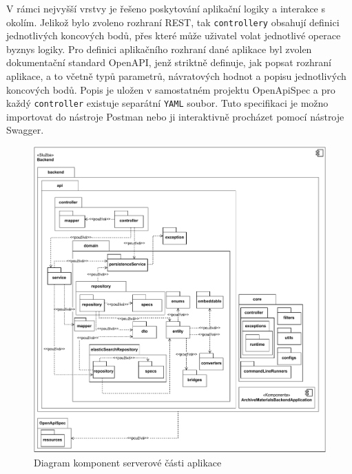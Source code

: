 \newpara
V rámci nejvyšší vrstvy je řešeno poskytování aplikační logiky a interakce s okolím. Jelikož bylo zvoleno rozhraní REST, tak \texttt{controllery} obsahují definici jednotlivých koncových bodů, přes které může uživatel volat jednotlivé operace byznys logiky.
\newpara
Pro definici aplikačního rozhraní dané aplikace byl zvolen dokumentační standard OpenAPI, jenž striktně definuje, jak popsat rozhraní aplikace, a to včetně typů parametrů, návratových hodnot a popisu jednotlivých koncových bodů. Popis je uložen v samostatném projektu OpenApiSpec a pro každý \texttt{controller} existuje separátní \texttt{YAML} soubor. Tuto specifikaci je možno importovat do nástroje Postman nebo ji interaktivně procházet pomocí nástroje Swagger.


\begin{figure}[htbp]
    \centering
    \includegraphics[scale=.65]{obrazky-figures/design/backend_component_diagram.pdf}
    \caption{Diagram komponent serverové části aplikace}
\end{figure}




